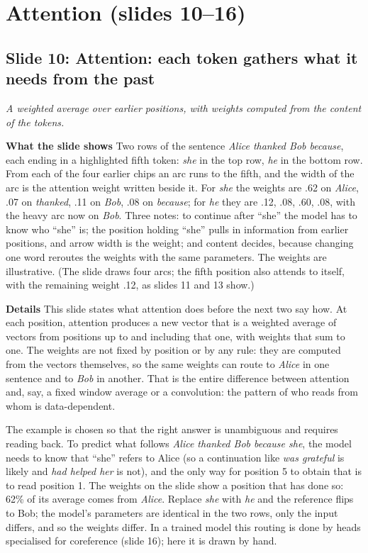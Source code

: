 \documentclass[11pt,letterpaper]{article}
\newcommand{\setstage}[1]{\colorlet{stagec}{#1}}
\newcommand{\slide}[3]{%
  \subsection[Slide #1: #2]{Slide #1: #2}%
  {\color{muted}\itshape #3\par}\medskip}
\newcommand{\para}[1]{\medskip\noindent\textbf{#1}\quad}
\begin{document}
\setstage{attn}
\section{Attention (slides 10--16)}

\slide{10}{Attention: each token gathers what it needs from the past}{A weighted average over earlier positions, with weights computed from the content of the tokens.}

\para{What the slide shows} Two rows of the sentence \emph{Alice thanked Bob because}, each ending in a highlighted fifth token: \emph{she} in the top row, \emph{he} in the bottom row. From each of the four earlier chips an arc runs to the fifth, and the width of the arc is the attention weight written beside it. For \emph{she} the weights are .62 on \emph{Alice}, .07 on \emph{thanked}, .11 on \emph{Bob}, .08 on \emph{because}; for \emph{he} they are .12, .08, .60, .08, with the heavy arc now on \emph{Bob}. Three notes: to continue after ``she'' the model has to know who ``she'' is; the position holding ``she'' pulls in information from earlier positions, and arrow width is the weight; and content decides, because changing one word reroutes the weights with the same parameters. The weights are illustrative. (The slide draws four arcs; the fifth position also attends to itself, with the remaining weight .12, as slides 11 and 13 show.)

\para{Details} This slide states what attention does before the next two say how. At each position, attention produces a new vector that is a weighted average of vectors from positions up to and including that one, with weights that sum to one. The weights are not fixed by position or by any rule: they are computed from the vectors themselves, so the same weights can route to \emph{Alice} in one sentence and to \emph{Bob} in another. That is the entire difference between attention and, say, a fixed window average or a convolution: the pattern of who reads from whom is data-dependent.

The example is chosen so that the right answer is unambiguous and requires reading back. To predict what follows \emph{Alice thanked Bob because she}, the model needs to know that ``she'' refers to Alice (so a continuation like \emph{was grateful} is likely and \emph{had helped her} is not), and the only way for position 5 to obtain that is to read position 1. The weights on the slide show a position that has done so: 62\% of its average comes from \emph{Alice}. Replace \emph{she} with \emph{he} and the reference flips to Bob; the model's parameters are identical in the two rows, only the input differs, and so the weights differ. In a trained model this routing is done by heads specialised for coreference (slide 16); here it is drawn by hand.
\end{document}
